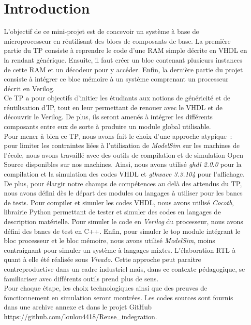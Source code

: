 \section{Introduction}

\gap

\indent L'objectif de ce mini-projet est de concevoir un système à base de microprocesseur en réutilisant des blocs de composants de base. La première partie du TP consiste à reprendre le code d'une RAM simple décrite en VHDL en la rendant générique.
Ensuite, il faut créer un bloc contenant plusieurs instances de cette RAM et un décodeur pour y accéder.
Enfin, la dernière partie du projet consiste à intégrer ce bloc mémoire à un système comprenant un processeur décrit en Verilog. \\
\indent Ce TP a pour objectifs d'initier les étudiants aux notions de généricité et de réutilisation d'\gls{IP}, tout en leur permettant de renouer avec le VHDL et de découvrir le Verilog.
De plus, ils seront amenés à intégrer les différents composants entre eux de sorte à produire un module global utilisable. \\
\indent Pour mener à bien ce TP, nous avons fait le choix d'une approche atypique : pour limiter les contraintes liées à l'utilisation de \textit{ModelSim} sur les machines de l'école, nous avons travaillé avec des outils de compilation et de simulation Open Source disponibles sur nos machines.
Ainsi, nous avons utilisé \textit{ghdl 2.0.0} pour la compilation et la simulation des codes VHDL et \textit{gtkwave 3.3.104} pour l'affichage.
De plus, pour élargir notre champs de compétences au delà des attendus du TP, nous avons défini dès le départ des modules ou langages à utiliser pour les bancs de tests.
Pour compiler et simuler les codes VHDL, nous avons utilisé \textit{Cocotb}, librairie Python permettant de tester et simuler des codes en langages de description matérielle.
Pour simuler le code en \textit{Verilog} du processeur, nous avons défini des bancs de test en C++.
Enfin, pour simuler le top module intégrant le bloc processeur et le bloc mémoire, nous avons utilisé \textit{ModelSim}, moins contraignant pour simuler un système à langages mixtes.
L'élaboration RTL à quant à elle été réalisée sous \textit{Vivado}.
Cette approche peut paraitre contreproductive dans un cadre industriel mais, dans ce contexte pédagogique, se familiariser avec différents outils prend plus de sens. \\
\indent Pour chaque étape, les choix technologiques ainsi que des preuves de fonctionnement en simulation seront montrées.
Les codes sources sont fournis dans une archive annexe et dans le projet GitHub https://github.com/loulou4418/Reuse\_indegration.

